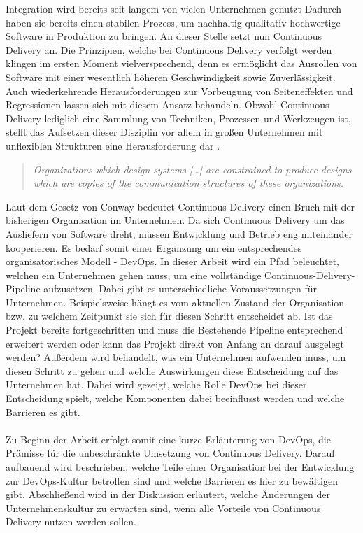  Integration wird bereits seit langem von vielen Unternehmen genutzt \cite{automic.2017} Dadurch haben sie bereits einen stabilen Prozess, um nachhaltig qualitativ hochwertige Software in Produktion zu bringen. An dieser Stelle setzt nun Continuous Delivery an. Die Prinzipien, welche bei Continuous Delivery verfolgt werden klingen im ersten Moment vielversprechend, denn es ermöglicht das Ausrollen von Software mit einer wesentlich höheren Geschwindigkeit sowie Zuverlässigkeit. Auch wiederkehrende Herausforderungen zur Vorbeugung von Seiteneffekten und Regressionen lassen sich mit diesem Ansatz behandeln. Obwohl Continuous Delivery lediglich eine Sammlung von Techniken, Prozessen und Werkzeugen ist, stellt das Aufsetzen dieser Disziplin vor allem in großen Unternehmen mit unflexiblen Strukturen eine Herausforderung dar \cite{Wolff.2016}. 
\begin{quote} \textit{\glqq Organizations which design systems […] are constrained to produce designs which are copies of the communication structures of these organizations. \grqq~}\cite[S.5]{Farley.2011} \end{quote} 

Laut dem Gesetz von Conway bedeutet Continuous Delivery einen Bruch mit der bisherigen Organisation im Unternehmen. Da sich Continuous Delivery um das Ausliefern von Software dreht, müssen Entwicklung und Betrieb eng miteinander kooperieren. Es bedarf somit einer Ergänzung um ein entsprechendes organisatorisches Modell - DevOps. In dieser Arbeit wird ein Pfad beleuchtet, welchen ein Unternehmen gehen muss, um eine vollständige Continuous-Delivery-Pipeline aufzusetzen. Dabei gibt es unterschiedliche Voraussetzungen für Unternehmen. Beispielsweise hängt es vom aktuellen Zustand der Organisation bzw. zu welchem Zeitpunkt sie sich für diesen Schritt entscheidet ab. Ist das Projekt bereits fortgeschritten und muss die Bestehende Pipeline entsprechend erweitert werden oder kann das Projekt direkt von Anfang an darauf ausgelegt werden? Außerdem wird behandelt, was ein Unternehmen aufwenden muss, um diesen Schritt zu gehen und welche Auswirkungen diese Entscheidung auf das Unternehmen hat. Dabei wird gezeigt, welche Rolle DevOps bei dieser Entscheidung spielt, welche Komponenten dabei beeinflusst werden und welche Barrieren es gibt. \\ \\ Zu Beginn der Arbeit erfolgt somit eine kurze Erläuterung von DevOps, die Prämisse für die unbeschränkte Umsetzung von Continuous Delivery. Darauf aufbauend wird beschrieben, welche Teile einer Organisation bei der Entwicklung zur DevOps-Kultur betroffen sind und welche Barrieren es hier zu bewältigen gibt. Abschließend wird in der Diskussion erläutert, welche Änderungen der Unternehmenskultur zu erwarten sind, wenn alle Vorteile von Continuous Delivery nutzen werden sollen.
